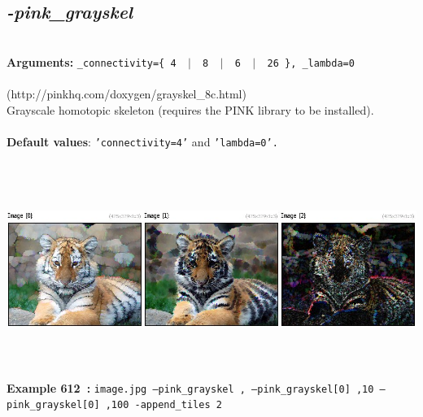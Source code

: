 \documentclass[a4paper,11pt,twoside]{book}
\begin{document}
\subsection{\emph{-pink\_grayskel} }\vspace*{-0.5em}
~\\\textbf{Arguments: } 
{\small \texttt{\_connectivity=\{ 4 ~$|$~ 8 ~$|$~ 6 ~$|$~ 26 \}, \_lambda=0}}\\~\\
(http://pinkhq.com/doxygen/grayskel\_8c.html)
~\\Grayscale homotopic skeleton (requires the PINK library to be installed).
~\\~\\\textbf{Default values}: {\small \texttt{'connectivity=4'} and \texttt{'lambda=0'.}}
\begin{center}\includegraphics[keepaspectratio=true,height=7cm,width=\textwidth]{img/gmic_def612.jpg}\\
{\footnotesize \textbf{Example 612~:} \texttt{image.jpg --pink\_grayskel , --pink\_grayskel[0] ,10 --pink\_grayskel[0] ,100 -append\_tiles 2}}
\end{center}
\end{document}
